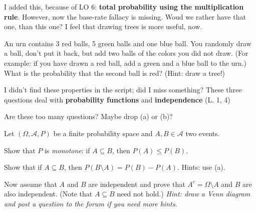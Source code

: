 \documentclass[a4paper,10pt,landscape,twocolumn]{scrartcl}
\begin{document}
\begin{exercise}
\begin{mycomment}
	I added this, because of LO 6: \textbf{total probability using the multiplication rule}. However, now the base-rate fallacy is missing. Woud we rather have that one, than this one? I feel that drawing trees is more useful, now.
\end{mycomment}

An urn contains 3 red balls, 5 green balls and one blue ball. You randomly draw a ball, don't put it back, but add two balls of the colors you did not draw. (For example: if you have drawn a red ball, add a green and a blue ball to the urn.) What is the probability that the second ball is red? (Hint: draw a tree!)
\end{exercise}

\begin{exercise}
	\begin{mycomment}
		I didn't find these properties in the script; did I miss something? These three questions deal with \textbf{probability functions} and \textbf{independence} (L. 1, 4)
		
		Are these too many questions? Maybe drop (a) or (b)?
	\end{mycomment}

	Let $(\Omega, \mathcal{A}, P)$ be a finite probability space and $A, B\in \mathcal A$ two events.
	\begin{subex}[1pt]
		Show that $P$ is \emph{monotone}: if $A \subseteq B$, then $P(A) \le P(B)$. 
	\end{subex}
	
	\begin{subex}[1pt]
		Show that if $A \subseteq B$, then $P(B \setminus A) = P(B) - P(A)$. Hints: use (a).
	\end{subex}
	
	\begin{subex}[1pt]
		Now assume that $A$ and $B$ are independent and prove that $A^c = \Omega\setminus A$ and $B$ are also independent. (Note that $A\subseteq B$ need not hold.) \emph{Hint: draw a Venn diagram and post a question to the forum if you need more hints.} 
	\end{subex}
\end{exercise}
\end{document}
